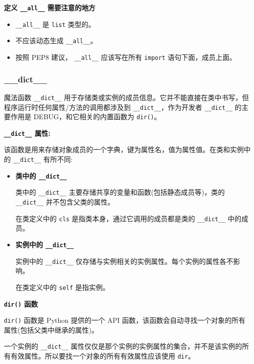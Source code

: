 \noindent\textbf{定义 \texttt{\_\_all\_\_} 需要注意的地方}

\begin{itemize}
    \item \texttt{\_\_all\_\_} 是 \texttt{list} 类型的。
    \item 不应该动态生成 \texttt{\_\_all\_\_}。
    \item 按照 PEP8 建议， \texttt{\_\_all\_\_} 应该写在所有 \texttt{import} 语句下面，成员上面。
\end{itemize}

\subsubsection{\_\_dict\_\_}

魔法函数 \texttt{\_\_dict\_\_} 用于存储类或实例的成员信息。它并不能直接在类中书写，但程序运行时任何属性/方法的调用都涉及到 \texttt{\_\_dict\_\_}，作为开发者 \texttt{\_\_dict\_\_} 的主要作用是 DEBUG，和它相关的内置函数为 \texttt{dir()}。  

\noindent\textbf{\texttt{\_\_dict\_\_} 属性:}

该函数是用来存储对象成员的一个字典，键为属性名，值为属性值。在类和实例中的 \texttt{\_\_dict\_\_} 有所不同:
\begin{itemize}
    \item \textbf{类中的 \texttt{\_\_dict\_\_}}  
    
    类中的 \texttt{\_\_dict\_\_} 主要存储共享的变量和函数(包括静态成员等)，类的 \texttt{\_\_dict\_\_} 并不包含父类的属性。

    在类定义中的 \texttt{cls} 是指类本身，通过它调用的成员都是类的 \texttt{\_\_dict\_\_} 中的成员。
    
    \item \textbf{实例中的 \texttt{\_\_dict\_\_}}
    
    实例中的 \texttt{\_\_dict\_\_} 仅存储与实例相关的实例属性。每个实例的属性各不影响。
    
    在类定义中的 \texttt{self} 是指实例。
\end{itemize} 

\noindent\textbf{\texttt{dir()} 函数}

\texttt{dir()} 函数是 Python 提供的一个 API 函数，该函数会自动寻找一个对象的所有属性(包括父类中继承的属性)。

一个实例的 \texttt{\_\_dict\_\_} 属性仅仅是那个实例的实例属性的集合，并不是该实例的所有有效属性。所以要找一个对象的所有有效属性应该使用 \texttt{dir}。

